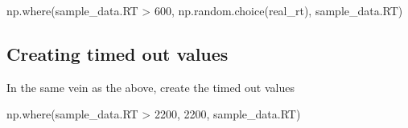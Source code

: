 \documentclass[]{article}
\newenvironment{Shaded}{\begin{snugshade}}{\end{snugshade}}
\newcommand{\DecValTok}[1]{\textcolor[rgb]{0.00,0.00,0.81}{{#1}}}
\newcommand{\NormalTok}[1]{{#1}}
\begin{document}
\begin{Shaded}
\begin{Highlighting}[]
\NormalTok{np.where(sample_data.RT > }\DecValTok{600}\NormalTok{, np.random.choice(real_rt), sample_data.RT)}
\end{Highlighting}
\end{Shaded}

\subsection{Creating timed out
values}\label{creating-timed-out-values-1}

In the same vein as the above, create the timed out values

\begin{Shaded}
\begin{Highlighting}[]
\NormalTok{np.where(sample_data.RT > }\DecValTok{2200}\NormalTok{, }\DecValTok{2200}\NormalTok{, sample_data.RT)}
\end{Highlighting}
\end{Shaded}
\end{document}
